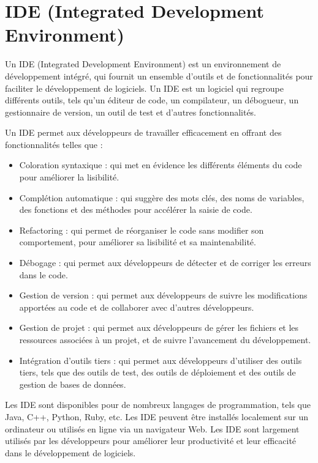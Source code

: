 \section{IDE (Integrated Development Environment)}\label{sec:ide}
Un IDE (Integrated Development Environment) est un environnement de développement intégré, qui fournit un ensemble d'outils et de fonctionnalités pour faciliter le développement de logiciels. Un IDE est un logiciel qui regroupe différents outils, tels qu'un éditeur de code, un compilateur, un débogueur, un gestionnaire de version, un outil de test et d'autres fonctionnalités.

Un IDE permet aux développeurs de travailler efficacement en offrant des fonctionnalités telles que :
\begin{itemize}
    \item Coloration syntaxique : qui met en évidence les différents éléments du code pour améliorer la lisibilité.
    \item Complétion automatique : qui suggère des mots clés, des noms de variables, des fonctions et des méthodes pour accélérer la saisie de code.
    \item Refactoring : qui permet de réorganiser le code sans modifier son comportement, pour améliorer sa lisibilité et sa maintenabilité.
    \item Débogage : qui permet aux développeurs de détecter et de corriger les erreurs dans le code.
    \item Gestion de version : qui permet aux développeurs de suivre les modifications apportées au code et de collaborer avec d'autres développeurs.
    \item Gestion de projet : qui permet aux développeurs de gérer les fichiers et les ressources associées à un projet, et de suivre l'avancement du développement.
    \item Intégration d'outils tiers : qui permet aux développeurs d'utiliser des outils tiers, tels que des outils de test, des outils de déploiement et des outils de gestion de bases de données.
\end{itemize}

Les IDE sont disponibles pour de nombreux langages de programmation, tels que Java, C++, Python, Ruby, etc. Les IDE peuvent être installés localement sur un ordinateur ou utilisés en ligne via un navigateur Web. Les IDE sont largement utilisés par les développeurs pour améliorer leur productivité et leur efficacité dans le développement de logiciels.